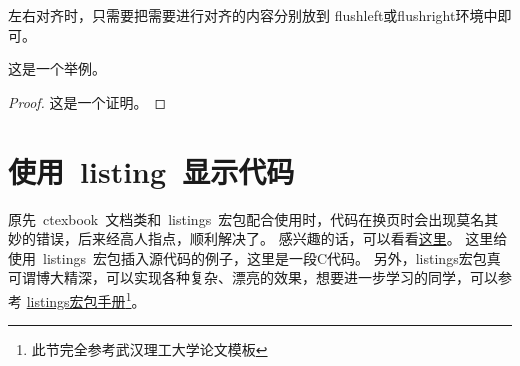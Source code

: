 左右对齐时，只需要把需要进行对齐的内容分别放到 flushleft或flushright环境中即可。
\begin{example}
这是一个举例。
\end{example}
\begin{proof}
这是一个证明。
\end{proof}
\section{使用~listing~显示代码}
原先~ctexbook~文档类和~listings~宏包配合使用时，代码在换页时会出现莫名其妙的错误，后来经高人指点，顺利解决了。
感兴趣的话，可以看看\href{http://bbs.ctex.org/viewthread.php?tid=53451}{这里}。
这里给使用~listings~宏包插入源代码的例子，这里是一段C代码。
另外，listings宏包真可谓博大精深，可以实现各种复杂、漂亮的效果，想要进一步学习的同学，可以参考
\href{http://mirror.ctan.org/macros/latex/contrib/listings/listings.pdf}{listings宏包手册\footnote{此节完全参考武汉理工大学论文模板}}。